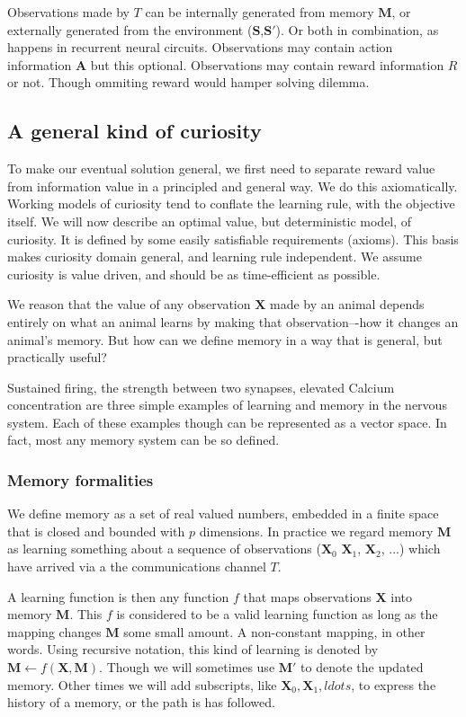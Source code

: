 Observations made by $T$ can be internally generated from memory $\mathbf{M}$, or externally generated from the environment ($\mathbf{S}$,$\mathbf{S'}$). Or both in combination, as happens in recurrent neural circuits. Observations may contain action information $\mathbf{A}$ but this optional. Observations may contain reward information $R$ or not. Though ommiting reward would hamper solving dilemma.

\subsection{A general kind of curiosity} 
To make our eventual solution general, we first need to separate reward value from information value in a principled and general way. We do this axiomatically. Working models of curiosity tend to conflate the learning rule, with the objective itself. We will now describe an optimal value, but deterministic model, of curiosity. It is defined by some easily satisfiable requirements (axioms). This basis makes curiosity domain general, and learning rule independent. We assume curiosity is value driven, and should be as time-efficient as possible.

We reason that the value of any observation $\mathbf{X}$ made by an animal depends entirely on what an animal learns by making that observation–-how it changes an animal's memory. But how can we define memory in a way that is general, but practically useful?

Sustained firing, the strength between two synapses, elevated Calcium concentration are three simple examples of learning and memory in the nervous system. Each of these examples though can be represented as a vector space. In fact, most any memory system can be so defined. 


\subsubsection{Memory formalities}
We define memory as a set of real valued numbers, embedded in a finite space that is closed and bounded with $p$ dimensions. In practice we regard memory $\mathbf{M}$ as learning something about a sequence of observations ($\mathbf{X}_0$ $\mathbf{X}_1$, $\mathbf{X}_2$, ...) which have arrived via a the communications channel $T$. 

A learning function is then any function $f$ that maps observations $\mathbf{X}$ into memory $\mathbf{M}$. This $f$ is considered to be a valid learning function as long as the mapping changes $\mathbf{M}$ some small amount. A non-constant mapping, in other words. Using recursive notation, this kind of learning is denoted by $\mathbf{M} \leftarrow f(\mathbf{X},\mathbf{M}) $. Though we will sometimes use $\mathbf{M'}$ to denote the updated memory. Other times we will add subscripts, like $\mathbf{X}_0,\mathbf{X}_1,ldots$, to express the history of a memory, or the path is has followed. 

